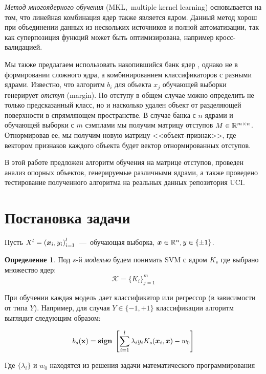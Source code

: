 \documentclass[12pt,twoside]{article}
\theoremstyle{plain}
\theoremstyle{remark}
\theoremstyle{definition}
\newtheorem{df}{Определение}[section]
\begin{document}
    \emph{Метод многоядерного обучения} (MKL,~multiple kernel learning) \cite{Dyrba2015, Bucak2014,Althloothi2014} основывается на том, что линейная комбинация ядер также является ядром. Данный метод хорош при объединении данных из нескольких источников и полной автоматизации, так как суперпозиция функций может быть оптимизирована, например кросс-валидацией.

    Мы также предлагаем использовать накопившийся банк ядер\cite{Smola2004} , однако не в формировании сложного ядра, а комбинированием классификаторов с разными ядрами. Известно, что алгоритм $b_i$ для объекта $x_j$ обучающей выборки генерирует \emph{отступ} (margin). По отступу в общем случае можно определить не только предсказанный класс, но и насколько удален объект от разделяющей поверхности в спрямляющем пространстве. В случае банка с $n$ ядрами и обучающей выборки с $m$ сэмплами
    мы получим матрицу отступов $M \in \R^{m\times n}$. Отнормировав ее, мы получим новую матрицу <<объект-признак>>, где вектором признаков каждого объекта будет вектор отнормированных отступов.

    В этой работе предложен алгоритм обучения на матрице отступов, проведен анализ опорных объектов, генерируемые различными ядрами, а также проведено тестирование полученного алгоритма на реальных данных репозитория UCI.


\section{Постановка задачи}

Пусть $X^l = \left(\boldsymbol{x}_i, y_i\right)_{i=1}^l$~---~обучающая выборка, $\boldsymbol{x}\in \mathbb{R}^n, y \in \{\pm 1\}$.

\begin{df}
	Под $s$-й \emph{моделью} будем понимать SVM с
ядром $K_s$ где выбрано множество ядер:
$$
\mathcal{K} = \{K_i\}_{j=1}^m
$$
\end{df}
	
При обучении каждая модель дает классификатор или регрессор (в зависимости от типа $Y$). Например, для случая $Y \in \{-1, +1\}$ классификации алгоритм выглядит следующим образом:

\begin{equation} \label{decision}
	b_s(\v{x}) = \sign\sbrs{\sum_{i=1}^l\lambda_i y_i K_s(\vec{x}_i, \vec{x}) - w_0}
\end{equation}

Где $\{\lambda_i\}$ и $w_0$ находятся из решения задачи математического программирования\cite{Smola2004}
\end{document}
